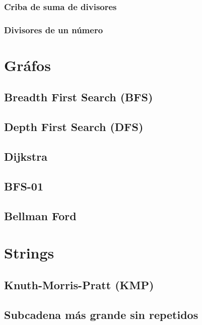 \subsubsection{Criba de suma de divisores}

\subsubsection{Divisores de un número}

\section{Gráfos}

\subsection{Breadth First Search (BFS)}

\subsection{Depth First Search (DFS)}

\subsection{Dijkstra}

\subsection{BFS-01}

\subsection{Bellman Ford}

\section{Strings}

\subsection{Knuth-Morris-Pratt (KMP)}

\subsection{Subcadena más grande sin repetidos}

